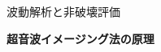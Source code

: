 \documentclass[10pt,a4j,dvipdfmx]{jarticle}
\newlength{\minitwocolumn}
\begin{document}
\newcommand{\fat}[1]{\mbox{\boldmath $#1$}}
\newcommand{\D}{\partial}
\newcommand{\w}{\omega}
\newcommand{\ga}{\alpha}
\newcommand{\gb}{\beta}
\newcommand{\gx}{\xi}
\newcommand{\gz}{\zeta}
\newcommand{\vhat}[1]{\hat{\fat{#1}}}
\newcommand{\spc}{\vspace{0.7\baselineskip}}
\newcommand{\halfspc}{\vspace{0.3\baselineskip}}

\newcommand{\twofig}[2]
 {
   \begin{figure}
     \begin{minipage}[t]{\minitwocolumn}
         \begin{center}   #1
         \end{center}
     \end{minipage}
         \hspace{\columnsep}
     \begin{minipage}[t]{\minitwocolumn}
         \begin{center} #2
         \end{center}
     \end{minipage}
   \end{figure}
 }
\begin{flushright}
	波動解析と非破壊評価\\
\end{flushright}
\begin{center}
	{\LARGE  \bf 超音波イメージング法の原理} \\
\end{center}
\setcounter{section}{3}
\end{document}

